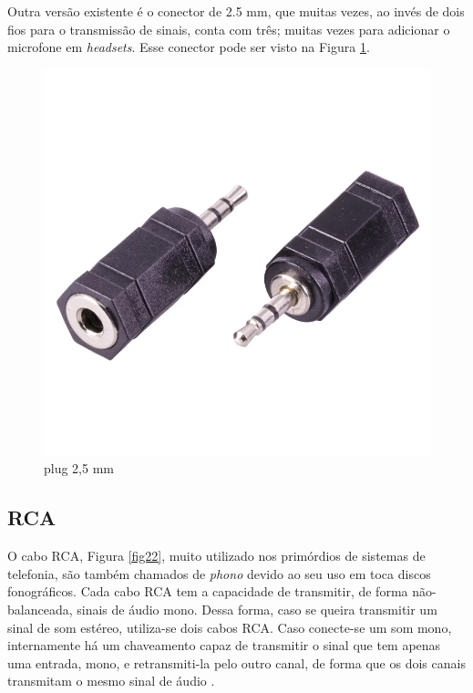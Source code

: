 Outra versão existente é o conector de 2.5 mm, que muitas vezes, ao invés de dois fios para o transmissão de sinais, conta com três; muitas vezes para adicionar o microfone em \textit{headsets}. Esse conector pode ser visto na Figura \ref{fig21}.

\begin{figure}[h]
	\centering
    \includegraphics[scale=0.2]{figuras/fig21.png}
	\caption{plug 2,5 mm}
	\label{fig21}
\end{figure}

\subsection{RCA}
 O cabo RCA, Figura \ref{fig22}, muito utilizado nos primórdios de sistemas de telefonia, são também chamados de \textit{phono} devido ao seu uso em toca discos fonográficos. Cada cabo RCA tem a capacidade de transmitir, de forma não-balanceada, sinais de áudio mono. Dessa forma, caso se queira transmitir um sinal de som estéreo, utiliza-se dois cabos RCA. Caso conecte-se um som mono, internamente há um chaveamento capaz de transmitir o sinal que tem apenas uma entrada, mono, e retransmiti-la pelo outro canal, de forma que os dois canais transmitam o mesmo sinal de áudio \cite{bartlett}.

